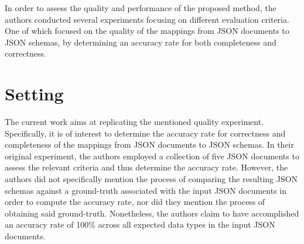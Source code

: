 \documentclass[sigconf, nonacm]{acmart}
\begin{document}
In order to assess the quality and performance of the proposed method, the authors conducted several experiments focusing on different evaluation criteria. One of which focused on the quality of the mappings from JSON documents to JSON schemas, by determining an accuracy rate for both completeness and correctness.

\section{Setting}

The current work aims at replicating the mentioned quality experiment. Specifically, it is of interest to determine the accuracy rate for correctness and completeness of the mappings from JSON documents to JSON schemas. In their original experiment, the authors employed a collection of five JSON documents to assess the relevant criteria and thus determine the accuracy rate. However, the authors did not specifically mention the process of comparing the resulting JSON schemas against a ground-truth associated with the input JSON documents in order to compute the accuracy rate, nor did they mention the process of obtaining said ground-truth. Nonetheless, the authors claim to have accomplished an accuracy rate of 100\% across all expected data types in the input JSON documents.
\end{document}
